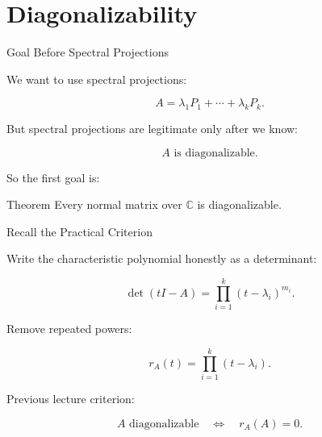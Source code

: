 \documentclass[10pt]{beamer}
\theoremstyle{definition}
\begin{document}
\section{Diagonalizability}

\begin{frame}{Goal Before Spectral Projections}

We want to use spectral projections:

$$
A=\lambda_1P_1+\cdots+\lambda_kP_k.
$$

\vfill\pause

But spectral projections are legitimate only after we know:

$$
A\text{ is diagonalizable.}
$$

\vfill

So the first goal is:

\begin{block}{Theorem}
Every normal matrix over $\mathbb{C}$ is diagonalizable.
\end{block}

\end{frame}


\begin{frame}{Recall the Practical Criterion}

Write the characteristic polynomial honestly as a determinant:

$$
\det(tI-A)=\prod_{i=1}^k(t-\lambda_i)^{m_i}.
$$

\vfill

Remove repeated powers:

$$
r_A(t)=\prod_{i=1}^k(t-\lambda_i).
$$

\vfill\pause

Previous lecture criterion:

$$
A\text{ diagonalizable}
\quad\Longleftrightarrow\quad
r_A(A)=0.
$$

\end{frame}
\end{document}
